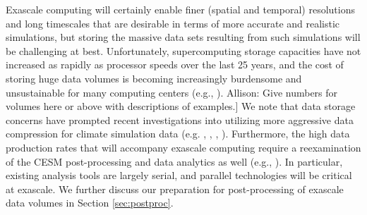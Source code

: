 Exascale computing will certainly enable finer (spatial and temporal) resolutions and long timescales that are desirable in terms of more accurate and realistic simulations, but storing the massive data sets resulting from such simulations will be challenging at best. Unfortunately, supercomputing storage capacities have not increased as rapidly as processor speeds over the last 25 years, and the cost of storing huge data volumes is becoming increasingly burdensome and unsustainable for many computing centers (e.g., \cite{kunkel2014}).  {\color{red} Allison:} Give numbers for volumes here or above with descriptions of examples.]  We note that data storage concerns have prompted recent investigations into utilizing more aggressive data compression for climate simulation data (e.g. \cite{baker2014}, \cite{baker2016-pepsi}, \cite{woodring11}, \cite{hubbe12}).  Furthermore, the high data production rates that will accompany exascale computing require a reexamination of the CESM post-processing and data analytics as well (e.g., \cite{paul2015}).  In particular, existing analysis tools are largely serial, and parallel technologies will be critical at exascale. We further discuss our preparation for post-processing of exascale data volumes in Section \ref{sec:postproc}.
